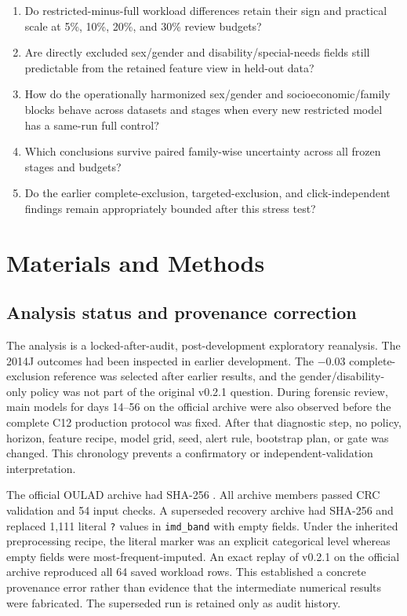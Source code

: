 \documentclass[11pt]{article}
\begin{document}
\begin{enumerate}[leftmargin=1.8em]
\item Do restricted-minus-full workload differences retain their sign and practical scale at 5\%, 10\%, 20\%, and 30\% review budgets?
\item Are directly excluded sex/gender and disability/special-needs fields still predictable from the retained feature view in held-out data?
\item How do the operationally harmonized sex/gender and socioeconomic/family blocks behave across datasets and stages when every new restricted model has a same-run full control?
\item Which conclusions survive paired family-wise uncertainty across all frozen stages and budgets?
\item Do the earlier complete-exclusion, targeted-exclusion, and click-independent findings remain appropriately bounded after this stress test?
\end{enumerate}

\section{Materials and Methods}

\subsection{Analysis status and provenance correction}

The analysis is a locked-after-audit, post-development exploratory reanalysis. The 2014J outcomes had been inspected in earlier development. The $-0.03$ complete-exclusion reference was selected after earlier results, and the gender/disability-only policy was not part of the original v0.2.1 question. During forensic review, main models for days 14--56 on the official archive were also observed before the complete C12 production protocol was fixed. After that diagnostic step, no policy, horizon, feature recipe, model grid, seed, alert rule, bootstrap plan, or gate was changed. This chronology prevents a confirmatory or independent-validation interpretation.

The official OULAD archive had SHA-256
\texttt{}.
All archive members passed CRC validation and 54 input checks. A superseded recovery archive had SHA-256
\texttt{}
and replaced 1,111 literal \texttt{?} values in \texttt{imd\_band} with empty fields. Under the inherited preprocessing recipe, the literal marker was an explicit categorical level whereas empty fields were most-frequent-imputed. An exact replay of v0.2.1 on the official archive reproduced all 64 saved workload rows. This established a concrete provenance error rather than evidence that the intermediate numerical results were fabricated. The superseded run is retained only as audit history.
\end{document}
